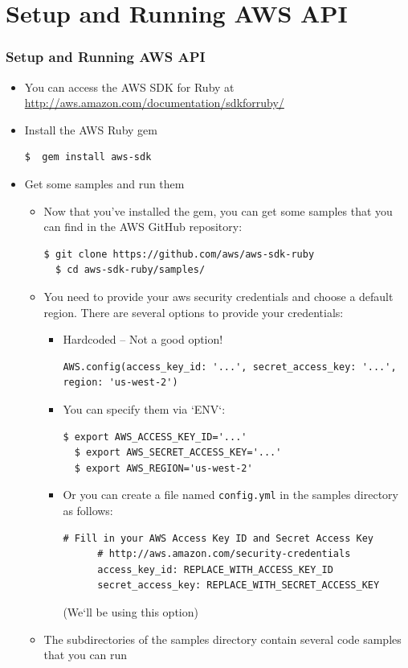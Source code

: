 \documentclass{beamer}
\begin{document}
\section{Setup and Running AWS API}
\begin{frame}
\frametitle{Setup and Running AWS API}
\begin{itemize}
  \item You can access the AWS SDK for Ruby at \url{http://aws.amazon.com/documentation/sdkforruby/}
  \item  Install the AWS Ruby gem

\lstset{language=shell}
\begin{lstlisting}[escapechar=!]
$  gem install aws-sdk
\end{lstlisting}

  \item Get some samples and run them
  \begin{itemize}
    \item Now that you’ve installed the gem, you can get some samples that you can find in the AWS GitHub repository:

\lstset{language=shell}
\begin{lstlisting}[escapechar=!]
  $ git clone https://github.com/aws/aws-sdk-ruby
  $ cd aws-sdk-ruby/samples/
\end{lstlisting}

  \item You need to provide your \acrshort{aws} security credentials and choose a default region. There are several options 
   to provide your credentials:
    \begin{itemize}
    
      \item Hardcoded -- Not a good option!
\begin{lstlisting}[escapechar=!]
     AWS.config(access_key_id: '...', secret_access_key: '...', region: 'us-west-2')
\end{lstlisting}
      \item You can specify them via `ENV`:
\lstset{language=shell}
\begin{lstlisting}[escapechar=!]
  $ export AWS_ACCESS_KEY_ID='...'
  $ export AWS_SECRET_ACCESS_KEY='...'
  $ export AWS_REGION='us-west-2'
\end{lstlisting}


      \item Or you can create a file named \texttt{config.yml} in the samples directory as follows:
\lstset{language=Ruby, style=eclipse}
\begin{lstlisting}[escapechar=!]
      # Fill in your AWS Access Key ID and Secret Access Key
      # http://aws.amazon.com/security-credentials
      access_key_id: REPLACE_WITH_ACCESS_KEY_ID
      secret_access_key: REPLACE_WITH_SECRET_ACCESS_KEY
\end{lstlisting}
    (We`ll be using this option)
    \end{itemize}
  \item The subdirectories of the samples directory contain several code samples that you can run
  \end{itemize}
\end{itemize}

\end{frame}
\end{document}
